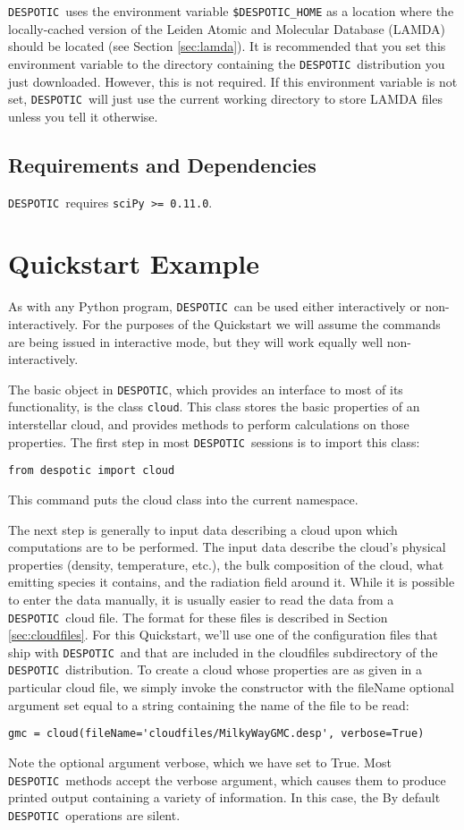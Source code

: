 \documentclass[12pt]{article}
\newcommand{\despotic}{\texttt{DESPOTIC}}
\begin{document}
\despotic\ uses the environment variable \verb=$DESPOTIC_HOME= as a location where the locally-cached version of the Leiden Atomic and Molecular Database (LAMDA) should be located (see Section \ref{sec:lamda}). It is recommended that you set this environment variable to the directory containing the \despotic\ distribution you just downloaded. However, this is not required. If this environment variable is not set, \despotic\ will just use the current working directory to store LAMDA files unless you tell it otherwise.


\subsection{Requirements and Dependencies}

\despotic\ requires \verb;sciPy >= 0.11.0;.

\clearpage

\section{Quickstart Example}

As with any Python program, \despotic\ can be used either interactively or non-interactively. For the purposes of the Quickstart we will assume the commands are being issued in interactive mode, but they will work equally well non-interactively.

The basic object in \despotic, which provides an interface to most of its functionality, is the class \texttt{cloud}. This class stores the basic properties of an interstellar cloud, and provides methods to perform calculations on those properties. The first step in most \despotic\ sessions is to import this class:
\begin{verbatim}
from despotic import cloud
\end{verbatim}
This command puts the cloud class into the current namespace.

The next step is generally to input data describing a cloud upon which computations are to be performed. The input data describe the cloud's physical properties (density, temperature, etc.), the bulk composition of the cloud, what emitting species it contains, and the radiation field around it. While it is possible to enter the data manually, it is usually easier to read the data from a \despotic\ cloud file. The format for these files is described in Section \ref{sec:cloudfiles}. For this Quickstart, we'll use one of the configuration files that ship with \despotic\, and that are included in the cloudfiles subdirectory of the \despotic\ distribution. To create a cloud whose properties are as given in a particular cloud file, we simply invoke the constructor with the fileName optional argument set equal to a string containing the name of the file to be read:
\begin{verbatim}
gmc = cloud(fileName='cloudfiles/MilkyWayGMC.desp', verbose=True)
\end{verbatim}
Note the optional argument verbose, which we have set to True. Most \despotic\ methods accept the verbose argument, which causes them to produce printed output containing a variety of information. In this case, the  By default \despotic\ operations are silent.
\end{document}
